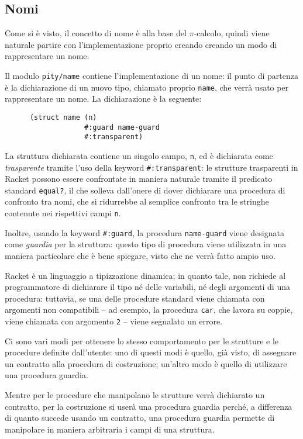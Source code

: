\subsection{Nomi}

Come si \`e visto, il concetto di nome \`e alla base del $\pi$-calcolo,
quindi viene naturale partire con l'implementazione proprio creando creando
un modo di rappresentare un nome.

Il modulo \lstinline{pity/name} contiene l'implementazione di un nome: il
punto di partenza \`e la dichiarazione di un nuovo tipo, chiamato proprio
\lstinline{name}, che verr\`a usato per rappresentare un nome. La
dichiarazione \`e la seguente:

\begin{lstlisting}
      (struct name (n)
                   #:guard name-guard
                   #:transparent)
\end{lstlisting}

La struttura dichiarata contiene un singolo campo, \lstinline{n}, ed \`e
dichiarata come \emph{trasparente} tramite l'uso della keyword
\lstinline{#:transparent}: le strutture trasparenti in Racket possono essere
confrontate in maniera naturale tramite il predicato standard
\lstinline{equal?}, il che solleva dall'onere di dover dichiarare una
procedura di confronto tra nomi, che si ridurrebbe al semplice confronto
tra le stringhe contenute nei rispettivi campi \lstinline{n}.

Inoltre, usando la keyword \lstinline{#:guard}, la procedura
\lstinline{name-guard} viene designata come \emph{guardia} per la struttura:
questo tipo di procedura viene utilizzata in una maniera particolare che \`e
bene spiegare, visto che ne verr\`a fatto ampio uso.

Racket \`e un linguaggio a tipizzazione dinamica; in quanto tale, non
richiede al programmatore di dichiarare il tipo n\'e delle variabili, n\'e
degli argomenti di una procedura: tuttavia, se una delle procedure standard
viene chiamata con argomenti non compatibili -- ad esempio, la procedura
\lstinline{car}, che lavora su coppie, viene chiamata con argomento
\lstinline{2} --  viene segnalato un errore.

Ci sono vari modi per ottenere lo stesso comportamento per le strutture e
le procedure definite dall'utente: uno di questi modi \`e quello, gi\`a
visto, di assegnare un contratto alla procedura di costruzione; un'altro
modo \`e quello di utilizzare una procedura guardia.

Mentre per le procedure che manipolano le strutture verr\`a dichiarato
un contratto, per la costruzione si user\`a una procedura guardia
perch\'e, a differenza di quanto succede usando un contratto, una
procedura guardia permette di manipolare in maniera arbitraria i campi
di una struttura.

